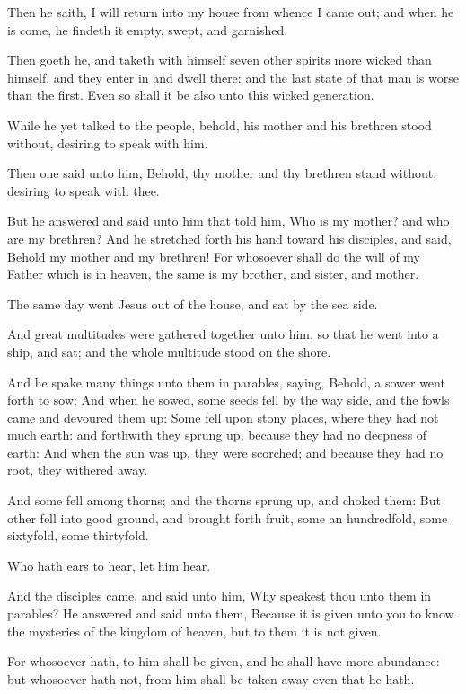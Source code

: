\Verse Then he saith, I will return into my house from whence I came out; and when he is come, he findeth it empty, swept, and garnished.

\Verse Then goeth he, and taketh with himself seven other spirits more wicked than himself, and they enter in and dwell there: and the last state of that man is worse than the first. Even so shall it be also unto this wicked generation.

\Verse While he yet talked to the people, behold, his mother and his brethren stood without, desiring to speak with him.

\Verse Then one said unto him, Behold, thy mother and thy brethren stand without, desiring to speak with thee.

\Verse But he answered and said unto him that told him, Who is my mother?  and who are my brethren?  \Verse And he stretched forth his hand toward his disciples, and said, Behold my mother and my brethren!  \Verse For whosoever shall do the will of my Father which is in heaven, the same is my brother, and sister, and mother.


\Chapter
\Verse The same day went Jesus out of the house, and sat by the sea side.

\Verse And great multitudes were gathered together unto him, so that he went into a ship, and sat; and the whole multitude stood on the shore.

\Verse And he spake many things unto them in parables, saying, Behold, a sower went forth to sow; \Verse And when he sowed, some seeds fell by the way side, and the fowls came and devoured them up: \Verse Some fell upon stony places, where they had not much earth: and forthwith they sprung up, because they had no deepness of earth: \Verse And when the sun was up, they were scorched; and because they had no root, they withered away.

\Verse And some fell among thorns; and the thorns sprung up, and choked them: \Verse But other fell into good ground, and brought forth fruit, some an hundredfold, some sixtyfold, some thirtyfold.

\Verse Who hath ears to hear, let him hear.

\Verse And the disciples came, and said unto him, Why speakest thou unto them in parables?  \Verse He answered and said unto them, Because it is given unto you to know the mysteries of the kingdom of heaven, but to them it is not given.

\Verse For whosoever hath, to him shall be given, and he shall have more abundance: but whosoever hath not, from him shall be taken away even that he hath.

